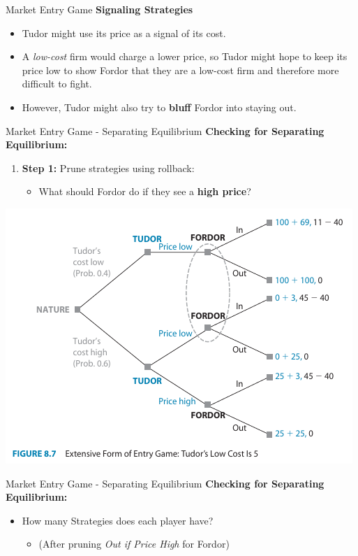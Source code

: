 \begin{frame}{Market Entry Game}
  \textbf{Signaling Strategies}
  \begin{itemize}
    \item Tudor might use its price as a \alert{signal} of its cost.
    \item A \textit{low-cost} firm would charge a lower price, 
    so Tudor might hope to keep its price low to show Fordor that they 
    are a low-cost firm and therefore more difficult to fight.
    \item However, Tudor might also try to \textbf{bluff} Fordor 
    into staying out.
  \end{itemize}
\end{frame}


\begin{frame}{Market Entry Game - Separating Equilibrium}
  \textbf{Checking for Separating Equilibrium:} 
  \begin{enumerate}
    \item \textbf{Step 1:} Prune strategies using rollback: 
    \begin{itemize}
      \item What should \alert{Fordor} do if they see a \textbf{high price}?
    \end{itemize}
  \end{enumerate}
  \begin{center}
    \includegraphics[width=.7\textwidth]{figures/Fig87.png} 
  \end{center} 
\end{frame}


\begin{frame}{Market Entry Game - Separating Equilibrium}
  \textbf{Checking for Separating Equilibrium:} \\ 
  \begin{itemize}
    \item How many Strategies does each player have? 
    \begin{itemize}
      \item (After pruning \textit{Out if Price High} for \alert{Fordor}) 
    \end{itemize}
  \end{itemize}
\end{frame}

